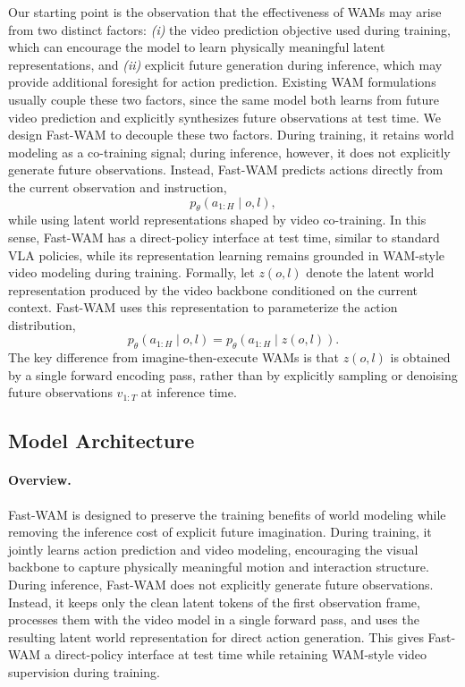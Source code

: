Our starting point is the observation that the effectiveness of WAMs may arise from two distinct factors: \emph{(i)} the video prediction objective used during training, which can encourage the model to learn physically meaningful latent representations, and \emph{(ii)} explicit future generation during inference, which may provide additional foresight for action prediction. Existing WAM formulations usually couple these two factors, since the same model both learns from future video prediction and explicitly synthesizes future observations at test time. We design Fast-WAM to decouple these two factors. During training, it retains world modeling as a co-training signal; during inference, however, it does not explicitly generate future observations. Instead, Fast-WAM predicts actions directly from the current observation and instruction,
\begin{equation}
    p_\theta(a_{1:H} \mid o, l),
\end{equation}
while using latent world representations shaped by video co-training. In this sense, Fast-WAM has a direct-policy interface at test time, similar to standard VLA policies, while its representation learning remains grounded in WAM-style video modeling during training. Formally, let $z(o, l)$ denote the latent world representation produced by the video backbone conditioned on the current context. Fast-WAM uses this representation to parameterize the action distribution,
\begin{equation}
    p_\theta(a_{1:H} \mid o, l)
    =
    p_\theta(a_{1:H} \mid z(o, l)).
\end{equation}
The key difference from imagine-then-execute WAMs is that $z(o, l)$ is obtained by a single forward encoding pass, rather than by explicitly sampling or denoising future observations $v_{1:T}$ at inference time.

\subsection{Model Architecture}

\paragraph{Overview.}
Fast-WAM is designed to preserve the training benefits of world modeling while removing the inference cost of explicit future imagination. During training, it jointly learns action prediction and video modeling, encouraging the visual backbone to capture physically meaningful motion and interaction structure. During inference, Fast-WAM does not explicitly generate future observations. Instead, it keeps only the clean latent tokens of the first observation frame, processes them with the video model in a single forward pass, and uses the resulting latent world representation for direct action generation. This gives Fast-WAM a direct-policy interface at test time while retaining WAM-style video supervision during training.



